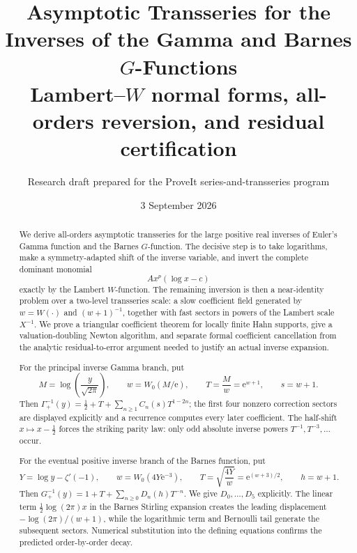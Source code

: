 \documentclass[11pt]{article}
\title{\textbf{Asymptotic Transseries for the Inverses of the Gamma and Barnes \(G\)-Functions}\\[0.4em]
\Large Lambert--\(W\) normal forms, all-orders reversion, and residual certification}
\author{Research draft prepared for the ProveIt series-and-transseries program}
\date{3 September 2026}
\theoremstyle{definition}
\theoremstyle{remark}
\newcommand{\e}{\mathrm e}
\newcommand{\Gaminv}{\Gamma_{+}^{-1}}
\newcommand{\Barinv}{G_{+}^{-1}}
\begin{document}
\maketitle

\begin{abstract}
We derive all-orders asymptotic transseries for the large positive real inverses of Euler's Gamma function and the Barnes \(G\)-function.  The decisive step is to take logarithms, make a symmetry-adapted shift of the inverse variable, and invert the complete dominant monomial
\[
  A x^{p}(\log x-c)
\]
exactly by the Lambert \(W\)-function.  The remaining inversion is then a near-identity problem over a two-level transseries scale: a slow coefficient field generated by \(w=W(\cdot)\) and \((w+1)^{-1}\), together with fast sectors in powers of the Lambert scale \(X^{-1}\).  We prove a triangular coefficient theorem for locally finite Hahn supports, give a valuation-doubling Newton algorithm, and separate formal coefficient cancellation from the analytic residual-to-error argument needed to justify an actual inverse expansion.

For the principal inverse Gamma branch, put
\[
 M=\log\!\left(\frac{y}{\sqrt{2\pi}}\right),\qquad
 w=W_{0}(M/\e),\qquad T=\frac{M}{w}=\e^{w+1},\qquad s=w+1.
\]
Then \(\Gaminv(y)=\tfrac12+T+\sum_{n\ge1}C_n(s)T^{1-2n}\); the first four nonzero correction sectors are displayed explicitly and a recurrence computes every later coefficient.  The half-shift \(x\mapsto x-\tfrac12\) forces the striking parity law: only odd absolute inverse powers \(T^{-1},T^{-3},\ldots\) occur.

For the eventual positive inverse branch of the Barnes function, put
\[
 Y=\log y-\zeta'(-1),\qquad
 w=W_{0}(4Y\e^{-3}),\qquad T=\sqrt{\frac{4Y}{w}}=\e^{(w+3)/2},\qquad h=w+1.
\]
Then \(\Barinv(y)=1+T+\sum_{n\ge0}D_n(h)T^{-n}\).  We give \(D_0,\ldots,D_5\) explicitly.  The linear term \(\tfrac12\log(2\pi)x\) in the Barnes Stirling expansion creates the leading displacement \(-\log(2\pi)/(w+1)\), while the logarithmic term and Bernoulli tail generate the subsequent sectors.  Numerical substitution into the defining equations confirms the predicted order-by-order decay.
\end{abstract}
\end{document}
